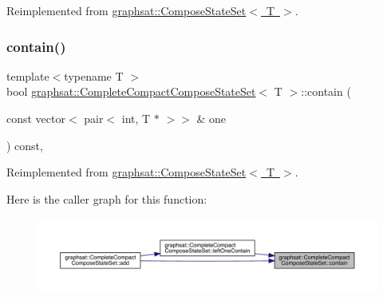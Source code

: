 Reimplemented from \mbox{\hyperlink{classgraphsat_1_1_compose_state_set_a143dc652308b16919867155d59fa0a09}{graphsat\+::\+Compose\+State\+Set$<$ T $>$}}.

\mbox{\label{classgraphsat_1_1_complete_compact_compose_state_set_a2ba10c7aa62262e0c7cc009573cd7a01}} 
\subsubsection{\texorpdfstring{contain()}{contain()}}
{\footnotesize\ttfamily template$<$typename T $>$ \\
bool \mbox{\hyperlink{classgraphsat_1_1_complete_compact_compose_state_set}{graphsat\+::\+Complete\+Compact\+Compose\+State\+Set}}$<$ T $>$\+::contain (\begin{DoxyParamCaption}\item[{const vector$<$ pair$<$ int, T $\ast$ $>$$>$ \&}]{one }\end{DoxyParamCaption}) const\hspace{0.3cm}{\ttfamily [inline]}, {\ttfamily [virtual]}}



Reimplemented from \mbox{\hyperlink{classgraphsat_1_1_compose_state_set_abfd0e46ca8319f69a506b7854850782b}{graphsat\+::\+Compose\+State\+Set$<$ T $>$}}.

Here is the caller graph for this function\+:\nopagebreak
\begin{figure}[H]
\begin{center}
\leavevmode
\includegraphics[width=350pt]{classgraphsat_1_1_complete_compact_compose_state_set_a2ba10c7aa62262e0c7cc009573cd7a01_icgraph}
\end{center}
\end{figure}
\mbox{\label{classgraphsat_1_1_complete_compact_compose_state_set_a6e731c47f2ab2415306aab198c7c4151}} 
